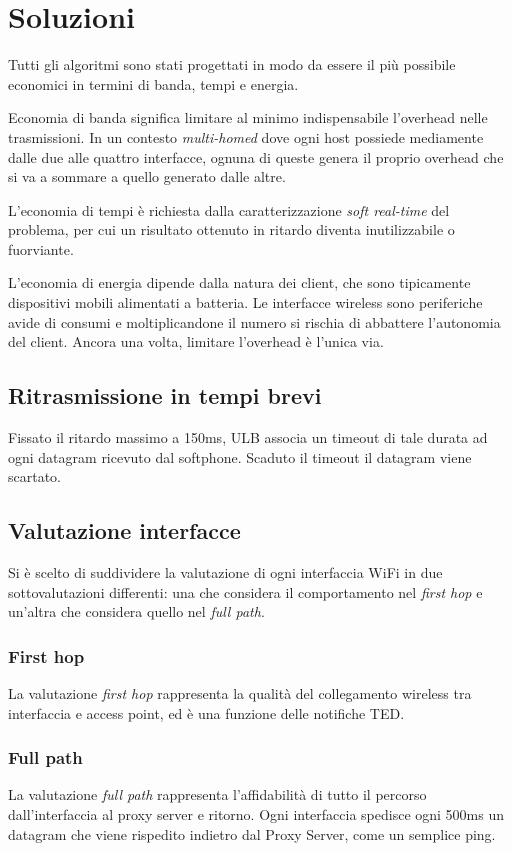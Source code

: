 \documentclass[12pt,a4paper,openright,twoside]{book}
\begin{document}
\section{Soluzioni}
Tutti gli algoritmi sono stati progettati in modo da essere il più
possibile economici in termini di banda, tempi e energia.

Economia di banda significa limitare al minimo indispensabile
l'overhead nelle trasmissioni. In un contesto \emph{multi-homed} dove
ogni host possiede mediamente dalle due alle quattro interfacce,
ognuna di queste genera il proprio overhead che si va a sommare a
quello generato dalle altre.

L'economia di tempi è richiesta dalla caratterizzazione \emph{soft
  real-time} del problema, per cui un risultato ottenuto in ritardo
diventa inutilizzabile o fuorviante.

L'economia di energia dipende dalla natura dei client, che sono
tipicamente dispositivi mobili alimentati a batteria. Le interfacce
wireless sono periferiche avide di consumi e moltiplicandone il numero
si rischia di abbattere l'autonomia del client. Ancora una volta,
limitare l'overhead è l'unica via.

\subsection{Ritrasmissione in tempi brevi}
Fissato il ritardo massimo a 150ms, ULB associa un timeout di tale
durata ad ogni datagram ricevuto dal softphone. Scaduto il timeout il
datagram viene scartato.

\subsection{Valutazione interfacce}
Si è scelto di suddividere la valutazione di ogni interfaccia WiFi in
due sottovalutazioni differenti: una che considera il comportamento
nel \emph{first hop} e un'altra che considera quello nel \emph{full
  path}.

\subsubsection{First hop}
La valutazione \emph{first hop} rappresenta la qualità del
collegamento wireless tra interfaccia e access point, ed è una
funzione delle notifiche TED.

\subsubsection{Full path}
La valutazione \emph{full path} rappresenta l'affidabilità di tutto il
percorso dall'interfaccia al proxy server e ritorno. Ogni interfaccia
spedisce ogni 500ms un datagram che viene rispedito indietro dal Proxy
Server, come un semplice ping.
\end{document}
